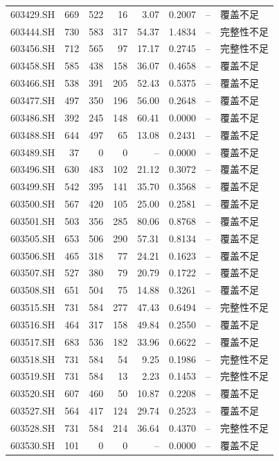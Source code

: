 \documentclass[10pt,a4paper]{article}
\begin{document}
\begin{longtable}{lrrr r r r l}
603429.SH & 669 & 522 & 16 & 3.07 & 0.2007 & -- & 覆盖不足\\
603444.SH & 730 & 583 & 317 & 54.37 & 1.4834 & -- & 完整性不足\\
603456.SH & 712 & 565 & 97 & 17.17 & 0.2745 & -- & 完整性不足\\
603458.SH & 585 & 438 & 158 & 36.07 & 0.4658 & -- & 覆盖不足\\
603466.SH & 538 & 391 & 205 & 52.43 & 0.5375 & -- & 覆盖不足\\
603477.SH & 497 & 350 & 196 & 56.00 & 0.2648 & -- & 覆盖不足\\
603486.SH & 392 & 245 & 148 & 60.41 & 0.0000 & -- & 覆盖不足\\
603488.SH & 644 & 497 & 65 & 13.08 & 0.2431 & -- & 覆盖不足\\
603489.SH & 37 & 0 & 0 & -- & 0.0000 & -- & 覆盖不足\\
603496.SH & 630 & 483 & 102 & 21.12 & 0.3072 & -- & 覆盖不足\\
603499.SH & 542 & 395 & 141 & 35.70 & 0.3568 & -- & 覆盖不足\\
603500.SH & 567 & 420 & 105 & 25.00 & 0.2581 & -- & 覆盖不足\\
603501.SH & 503 & 356 & 285 & 80.06 & 0.8768 & -- & 覆盖不足\\
603505.SH & 653 & 506 & 290 & 57.31 & 0.8134 & -- & 覆盖不足\\
603506.SH & 465 & 318 & 77 & 24.21 & 0.1623 & -- & 覆盖不足\\
603507.SH & 527 & 380 & 79 & 20.79 & 0.1722 & -- & 覆盖不足\\
603508.SH & 651 & 504 & 75 & 14.88 & 0.3261 & -- & 覆盖不足\\
603515.SH & 731 & 584 & 277 & 47.43 & 0.6494 & -- & 完整性不足\\
603516.SH & 464 & 317 & 158 & 49.84 & 0.2550 & -- & 覆盖不足\\
603517.SH & 683 & 536 & 182 & 33.96 & 0.6622 & -- & 覆盖不足\\
603518.SH & 731 & 584 & 54 & 9.25 & 0.1986 & -- & 完整性不足\\
603519.SH & 731 & 584 & 13 & 2.23 & 0.1453 & -- & 完整性不足\\
603520.SH & 607 & 460 & 50 & 10.87 & 0.2208 & -- & 覆盖不足\\
603527.SH & 564 & 417 & 124 & 29.74 & 0.2523 & -- & 覆盖不足\\
603528.SH & 731 & 584 & 214 & 36.64 & 0.4370 & -- & 完整性不足\\
603530.SH & 101 & 0 & 0 & -- & 0.0000 & -- & 覆盖不足\\

\end{longtable}
\end{document}
